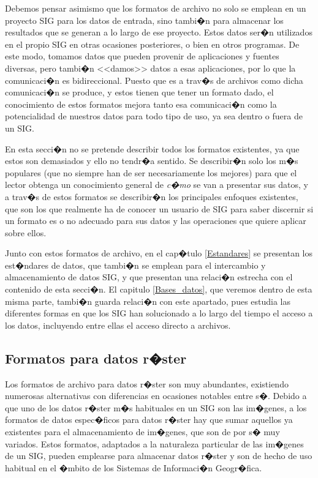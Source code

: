 Debemos pensar asimismo que los formatos de archivo no solo se emplean en un proyecto SIG para los datos de entrada, sino tambi�n para almacenar los resultados que se generan a lo largo de ese proyecto. Estos datos ser�n utilizados en el propio SIG en otras ocasiones posteriores, o bien en otros programas. De este modo, tomamos datos que pueden provenir de aplicaciones y fuentes diversas, pero tambi�n <<damos>> datos a esas aplicaciones, por lo que la comunicaci�n es bidireccional. Puesto que es a trav�s de archivos como dicha comunicaci�n se produce, y estos tienen que tener un formato dado, el conocimiento de estos formatos mejora tanto esa comunicaci�n como la potencialidad de nuestros datos para todo tipo de uso, ya sea dentro o fuera de un SIG.

En esta secci�n no se pretende describir todos los formatos existentes, ya que estos son demasiados y ello no tendr�a sentido. Se describir�n solo los m�s populares (que no siempre han de ser necesariamente los mejores) para que el lector obtenga un conocimiento general de \emph{c�mo} se van a presentar sus datos, y a trav�s de estos formatos se describir�n los principales enfoques existentes, que son los que realmente ha de conocer un usuario de SIG para saber discernir si un formato es o no adecuado para sus datos y las operaciones que quiere aplicar sobre ellos.

Junto con estos formatos de archivo, en el cap�tulo \ref{Estandares} se presentan los est�ndares de datos, que tambi�n se emplean para el intercambio y almacenamiento de datos SIG, y que presentan una relaci�n estrecha con el contenido de esta secci�n. El capitulo \ref{Bases_datos}, que veremos dentro de esta misma parte, tambi�n guarda relaci�n con este apartado, pues estudia las diferentes formas en que los SIG han solucionado a lo largo del tiempo el acceso a los datos, incluyendo entre ellas el acceso directo a archivos.

\subsection{Formatos para datos r�ster}

Los formatos de archivo para datos r�ster son muy abundantes, existiendo numerosas alternativas con diferencias en ocasiones notables entre s�. Debido a que uno de los datos r�ster m�s habituales en un SIG son las im�genes, a los formatos de datos espec�ficos para datos r�ster hay que sumar aquellos ya existentes para el almacenamiento de im�genes, que son de por s� muy variados. Estos formatos, adaptados a la naturaleza particular de las im�genes de un SIG, pueden emplearse para almacenar datos r�ster y son de hecho de uso habitual en el �mbito de los Sistemas de Informaci�n Geogr�fica.

